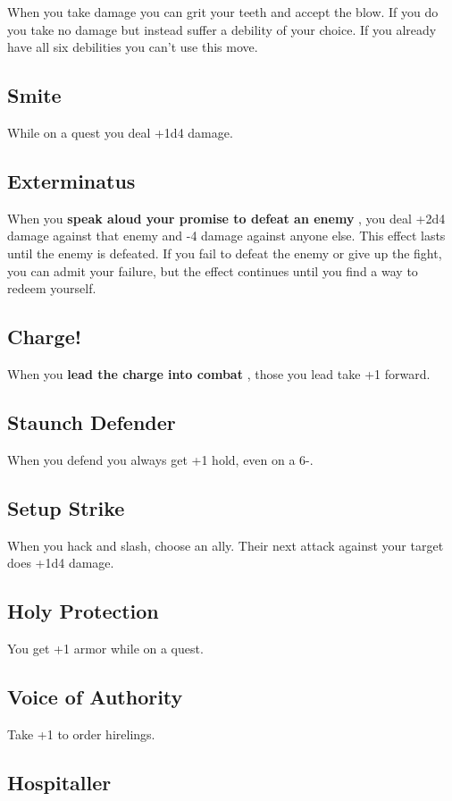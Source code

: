  When you take damage you can grit your teeth and accept the blow. If you do you take no damage but instead suffer a debility of your choice. If you already have all six debilities you can't use this move.
\subsection{Smite}


 While on a quest you deal +1d4 damage.
\subsection{Exterminatus}


 When you \textbf{speak aloud your promise to defeat an enemy}
, you deal +2d4 damage against that enemy and -4 damage against anyone else. This effect lasts until the enemy is defeated. If you fail to defeat the enemy or give up the fight, you can admit your failure, but the effect continues until you find a way to redeem yourself.
\subsection{Charge!}


 When you \textbf{lead the charge into combat}
, those you lead take +1 forward.
\subsection{Staunch Defender}


 When you defend you always get +1 hold, even on a 6-.
\subsection{Setup Strike}


 When you hack and slash, choose an ally. Their next attack against your target does +1d4 damage.
\subsection{Holy Protection}


 You get +1 armor while on a quest.
\subsection{Voice of Authority}


 Take +1 to order hirelings.
\subsection{Hospitaller}


